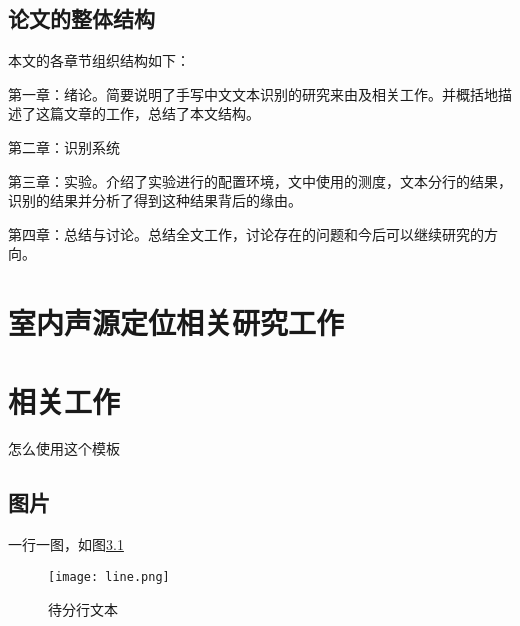 \documentclass[winfonts]{njuthesis}
\begin{document}
	\section{论文的整体结构}
		本文的各章节组织结构如下：
		
		第一章：绪论。简要说明了手写中文文本识别的研究来由及相关工作。并概括地描述了这篇文章的工作，总结了本文结构。
		
		第二章：识别系统
		
		第三章：实验。介绍了实验进行的配置环境，文中使用的测度，文本分行的结果，识别的结果并分析了得到这种结果背后的缘由。
		
		第四章：总结与讨论。总结全文工作，讨论存在的问题和今后可以继续研究的方向。

\chapter{室内声源定位相关研究工作}
	\section{}
	
	\section{}
	
	\section{}
	
	\section{}

\chapter{相关工作}\label{chapter_work}

	怎么使用这个模板
	
	\section{图片}
		一行一图，如图\ref{fig:line}
		\begin{figure}[htbp]
		   \centering
		   \texttt{[image: line.png]} %
		   \caption{待分行文本}
		   \label{fig:line}
		\end{figure}
\end{document}
